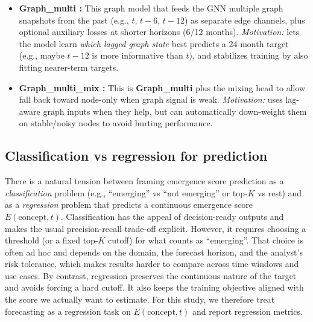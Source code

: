 \documentclass[pdflatex,sn-basic]{sn-jnl}
\begin{document}
\begin{itemize}
  attention (feature-level mixing). In \textbf{Graph\_mix}, the model builds two separate temporal
  paths (node-only and graph-only) and mixes their \emph{predictions} after temporal attention using
  $\alpha$. These are not equivalent: \textbf{Graph\_base} changes the sequence fed into attention, whereas
  graph\_mix leaves the temporal dynamics separate and blends only the final outputs.
  \item \textbf{Graph\_multi :} This graph model that feeds the GNN multiple graph snapshots from the past
  (e.g., $t$, $t-6$, $t-12$) as separate edge channels, plus optional auxiliary losses at shorter
  horizons (6/12 months). \emph{Motivation:} lets the model learn \emph{which lagged graph state}
  best predicts a 24-month target (e.g., maybe $t-12$ is more informative than $t$), and stabilizes
  training by also fitting nearer-term targets.
  \item \textbf{Graph\_multi\_mix :} This is \textbf{Graph\_multi} plus the mixing head to allow fall back toward node-only when graph signal is weak. \emph{Motivation:} uses lag-aware graph inputs when they help, but can automatically down-weight them on stable/noisy nodes to avoid hurting performance.
\end{itemize}

\subsection{Classification vs regression for prediction}
There is a natural tension between framing emergence score prediction as a \emph{classification} problem (e.g., ``emerging'' vs ``not emerging'' or top-$K$ vs rest) and as a \emph{regression} problem that predicts a continuous emergence score $E(\text{concept}, t)$.
Classification has the appeal of decision-ready outputs and makes the usual precision-recall trade-off explicit.
However, it requires choosing a threshold (or a fixed top-$K$ cutoff) for what counts as ``emerging''.
That choice is often ad hoc and depends on the domain, the forecast horizon, and the analyst's risk tolerance, which makes results harder to compare across time windows and use cases.
By contrast, regression preserves the continuous nature of the target and avoids forcing a hard cutoff.
It also keeps the training objective aligned with the score we actually want to estimate.
For this study, we therefore treat forecasting as a regression task on $E(\text{concept}, t)$ and report regression metrics.
\end{document}
